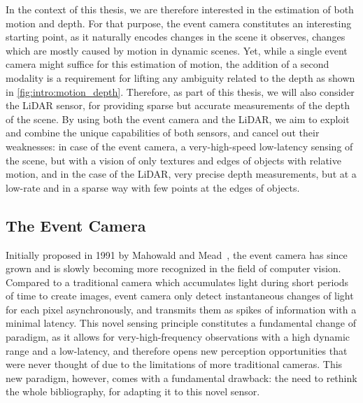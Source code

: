 In the context of this thesis, we are therefore interested in the estimation of both motion and depth. For that purpose, the event camera constitutes an interesting starting point, as it naturally encodes changes in the scene it observes, changes which are mostly caused by motion in dynamic scenes. Yet, while a single event camera might suffice for this estimation of motion, the addition of a second modality is a requirement for lifting any ambiguity related to the depth as shown in \cref{fig:intro:motion_depth}. Therefore, as part of this thesis, we will also consider the LiDAR sensor, for providing sparse but accurate measurements of the depth of the scene. By using both the event camera and the LiDAR, we aim to exploit and combine the unique capabilities of both sensors, and cancel out their weaknesses: in case of the event camera, a very-high-speed low-latency sensing of the scene, but with a vision of only textures and edges of objects with relative motion, and in the case of the LiDAR, very precise depth measurements, but at a low-rate and in a sparse way with few points at the edges of objects.

\subsection{The Event Camera}\label{sec:intro:context:evtcam}
Initially proposed in 1991 by Mahowald and Mead~\cite{Mahowald1991TheSR,Mahowald1992VLSIAO}, the event camera has since grown and is slowly becoming more recognized in the field of computer vision. Compared to a traditional camera which accumulates light during short periods of time to create images, event camera only detect instantaneous changes of light for each pixel asynchronously, and transmits them as spikes of information with a minimal latency. This novel sensing principle constitutes a fundamental change of paradigm, as it allows for very-high-frequency observations with a high dynamic range and a low-latency, and therefore opens new perception opportunities that were never thought of due to the limitations of more traditional cameras. This new paradigm, however, comes with a fundamental drawback: the need to rethink the whole bibliography, for adapting it to this novel sensor.

